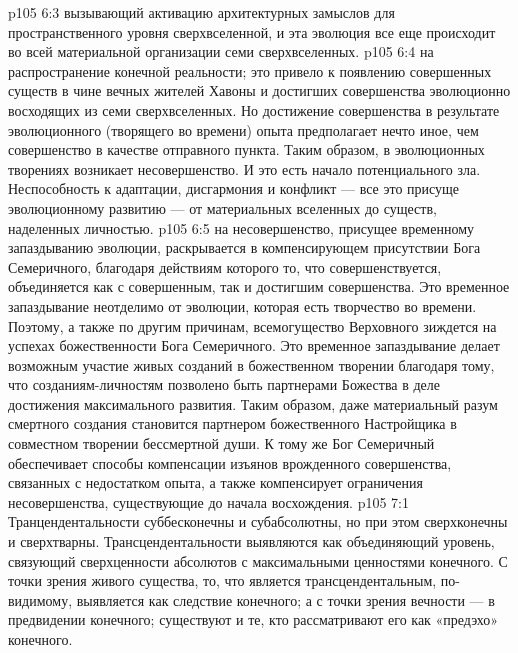 \vs p105 6:3 \bibnobreakspace {} вызывающий активацию архитектурных замыслов для пространственного уровня сверхвселенной, и эта эволюция все еще происходит во всей материальной организации семи сверхвселенных.
\vs p105 6:4 \bibnobreakspace {} на распространение конечной реальности; это привело к появлению совершенных существ в чине вечных жителей Хавоны и достигших совершенства эволюционно восходящих из семи сверхвселенных. Но достижение совершенства в результате эволюционного (творящего во времени) опыта предполагает нечто иное, чем совершенство в качестве отправного пункта. Таким образом, в эволюционных творениях возникает несовершенство. И это есть начало потенциального зла. Неспособность к адаптации, дисгармония и конфликт --- все это присуще эволюционному развитию --- от материальных вселенных до существ, наделенных личностью.
\vs p105 6:5 \bibnobreakspace {} на несовершенство, присущее временному запаздыванию эволюции, раскрывается в компенсирующем присутствии Бога Семеричного, благодаря действиям которого то, что совершенствуется, объединяется как с совершенным, так и достигшим совершенства. Это временное запаздывание неотделимо от эволюции, которая есть творчество во времени. Поэтому, а также по другим причинам, всемогущество Верховного зиждется на успехах божественности Бога Семеричного. Это временное запаздывание делает возможным участие живых созданий в божественном творении благодаря тому, что созданиям\hyp{}личностям позволено быть партнерами Божества в деле достижения максимального развития. Таким образом, даже материальный разум смертного создания становится партнером божественного Настройщика в совместном творении бессмертной души. К тому же Бог Семеричный обеспечивает способы компенсации изъянов врожденного совершенства, связанных с недостатком опыта, а также компенсирует ограничения несовершенства, существующие до начала восхождения.
\vs p105 7:1 Транцендентальности суббесконечны и субабсолютны, но при этом сверхконечны и сверхтварны. Трансцендентальности выявляются как объединяющий уровень, связующий сверхценности абсолютов с максимальными ценностями конечного. С точки зрения живого существа, то, что является трансцендентальным, по\hyp{}видимому, выявляется как следствие конечного; а с точки зрения вечности --- в предвидении конечного; существуют и те, кто рассматривают его как «предэхо» конечного.
